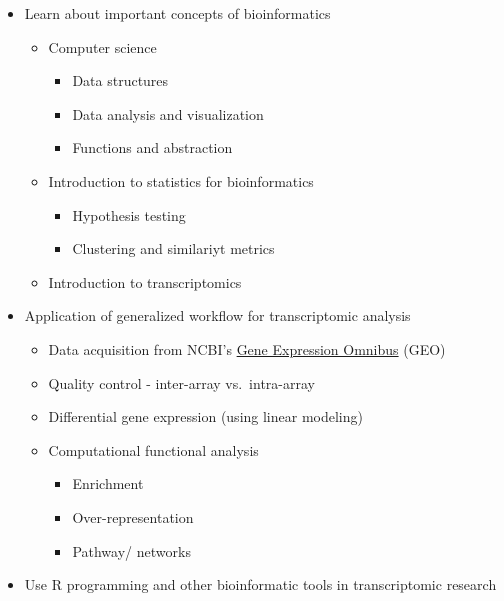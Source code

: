 \documentclass[
]{book}
\providecommand{\tightlist}{%
  \setlength{\itemsep}{0pt}\setlength{\parskip}{0pt}}
\theoremstyle{definition}
\theoremstyle{definition}
\theoremstyle{definition}
\theoremstyle{definition}
\theoremstyle{remark}
\begin{document}
\begin{itemize}
\tightlist
\item
  Learn about important concepts of bioinformatics

  \begin{itemize}
  \tightlist
  \item
    Computer science

    \begin{itemize}
    \tightlist
    \item
      Data structures
    \item
      Data analysis and visualization
    \item
      Functions and abstraction
    \end{itemize}
  \item
    Introduction to statistics for bioinformatics

    \begin{itemize}
    \tightlist
    \item
      Hypothesis testing
    \item
      Clustering and similariyt metrics
    \end{itemize}
  \item
    Introduction to transcriptomics
  \end{itemize}
\item
  Application of generalized workflow for transcriptomic analysis

  \begin{itemize}
  \tightlist
  \item
    Data acquisition from NCBI's \href{https://www.ncbi.nlm.nih.gov/geo/}{Gene Expression Omnibus} (GEO)
  \item
    Quality control - inter-array vs.~intra-array
  \item
    Differential gene expression (using linear modeling)
  \item
    Computational functional analysis

    \begin{itemize}
    \tightlist
    \item
      Enrichment
    \item
      Over-representation
    \item
      Pathway/ networks
    \end{itemize}
  \end{itemize}
\item
  Use R programming and other bioinformatic tools in transcriptomic research


\end{itemize}
\end{document}
